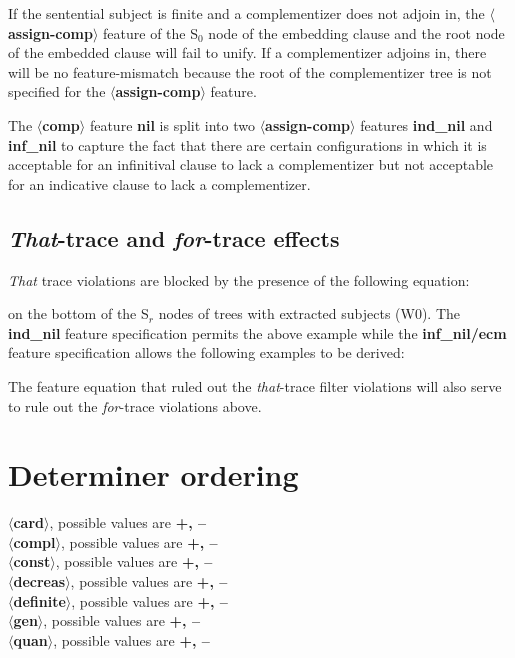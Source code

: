 
If the sentential subject is finite and a complementizer does
not adjoin in, the {\bf $\langle$assign-comp$\rangle$} feature of the 
S$_{0}$ node of the embedding clause and the root node of the
embedded clause will fail to unify. If a complementizer adjoins in,
there will be no feature-mismatch because the root of the
complementizer tree is not specified for the {\bf $\langle$assign-comp$\rangle$} feature.

The {\bf $\langle$comp$\rangle$} feature {\bf nil} is split into two
{\bf $\langle$assign-comp$\rangle$} features {\bf ind\_nil} and
{\bf inf\_nil} to capture the fact that there are certain configurations in
which it is acceptable for an infinitival clause to lack a complementizer
but not acceptable for an indicative clause to lack a complementizer. 

\subsection{{\em That}-trace and {\em for}-trace effects}


{\em That} trace violations are blocked by the presence of the following
equation:


on the bottom of the S$_{r}$ nodes of trees with extracted subjects (W0). 
The {\bf ind\_nil} feature specification permits the above example
while the {\bf inf\_nil/ecm} feature specification allows the
following examples to be derived:


The feature equation that ruled out the {\em that}-trace filter violations
will also serve to rule out the {\em for}-trace violations above.

\section{Determiner ordering}
{\bf $\langle$card$\rangle$}, possible values are {\bf +, --}\\
{\bf $\langle$compl$\rangle$}, possible values are {\bf +, --}\\
{\bf $\langle$const$\rangle$}, possible values are {\bf +, --}\\
{\bf $\langle$decreas$\rangle$}, possible values are {\bf +, --}\\
{\bf $\langle$definite$\rangle$}, possible values are {\bf +, --}\\
{\bf $\langle$gen$\rangle$}, possible values are {\bf +, --}\\
{\bf $\langle$quan$\rangle$}, possible values are {\bf +, --}

